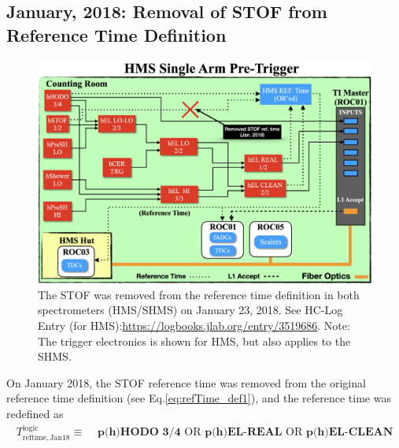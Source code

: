 \documentclass[11pt]{article}
\begin{document}
\subsection{January, 2018: Removal of STOF from Reference Time Definition}\label{ssec:jan2018}
\begin{figure}[H]
  \centering
  \includegraphics[scale=0.38]{./Jan2018_trigger_change.png}
  \caption{The STOF was removed from the reference time definition in both spectrometers (HMS/SHMS) on January 23, 2018. See HC-Log Entry (for HMS):\url{https://logbooks.jlab.org/entry/3519686}. Note: The trigger
  electronics is shown for HMS, but also applies to the SHMS.}
  \label{fig:stof_refTime_remove}
\end{figure}
On January 2018, the STOF reference time was removed from the original reference time definition (see Eq.\ref{eq:refTime_def1}), and the reference time was redefined as
\begin{align}
  T^{\mathrm{logic}}_{\mathrm{reftime,Jan18}} \equiv &\textbf{ p(h)HODO 3/4} \text{ OR } \textbf{p(h)EL-REAL} \text{ OR } \textbf{p(h)EL-CLEAN}
  \label{eq:refTime_def2}
\end{align}
\end{document}
